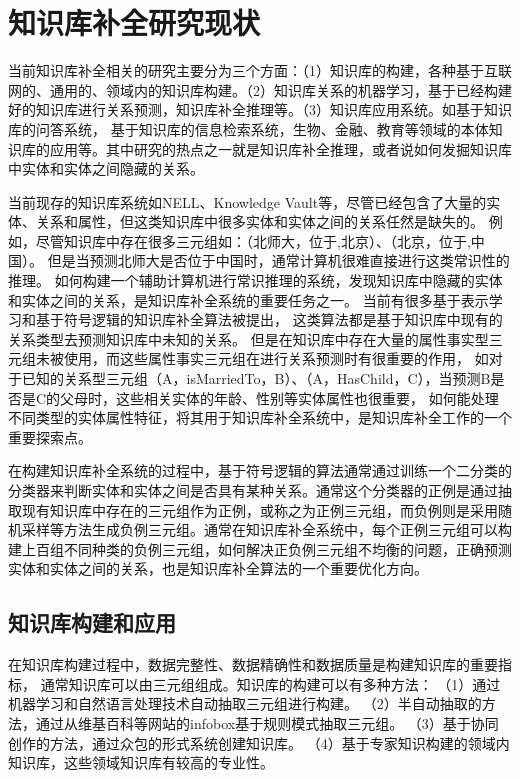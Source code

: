 

\chapter{知识库补全研究现状}
\label{cha:related-work}

当前知识库补全相关的研究主要分为三个方面：（1）知识库的构建，各种基于互联网的、通用的、领域内的知识库构建。（2）知识库关系的机器学习，基于已经构建好的知识库进行关系预测，知识库补全推理等。（3）知识库应用系统。如基于知识库的问答系统，
基于知识库的信息检索系统，生物、金融、教育等领域的本体知识库的应用等。其中研究的热点之一就是知识库补全推理，或者说如何发掘知识库中实体和实体之间隐藏的关系。

当前现存的知识库系统如NELL、Knowledge Vault等，尽管已经包含了大量的实体、关系和属性，但这类知识库中很多实体和实体之间的关系任然是缺失的。
例如，尽管知识库中存在很多三元组如：（北师大，位于,北京）、（北京，位于,中国）。
但是当预测北师大是否位于中国时，通常计算机很难直接进行这类常识性的推理。
如何构建一个辅助计算机进行常识推理的系统，发现知识库中隐藏的实体和实体之间的关系，是知识库补全系统的重要任务之一。
当前有很多基于表示学习和基于符号逻辑的知识库补全算法被提出，
这类算法都是基于知识库中现有的关系类型去预测知识库中未知的关系。
但是在知识库中存在大量的属性事实型三元组未被使用，而这些属性事实三元组在进行关系预测时有很重要的作用，
如对于已知的关系型三元组（A，isMarriedTo，B）、（A，HasChild，C），当预测B是否是C的父母时，这些相关实体的年龄、性别等实体属性也很重要，
如何能处理不同类型的实体属性特征，将其用于知识库补全系统中，是知识库补全工作的一个重要探索点。

在构建知识库补全系统的过程中，基于符号逻辑的算法通常通过训练一个二分类的分类器来判断实体和实体之间是否具有某种关系。通常这个分类器的正例是通过抽取现有知识库中存在的三元组作为正例，或称之为正例三元组，而负例则是采用随机采样等方法生成负例三元组。通常在知识库补全系统中，每个正例三元组可以构建上百组不同种类的负例三元组，如何解决正负例三元组不均衡的问题，正确预测实体和实体之间的关系，也是知识库补全算法的一个重要优化方向。

\section{知识库构建和应用}
在知识库构建过程中，数据完整性、数据精确性和数据质量是构建知识库的重要指标，
通常知识库可以由三元组组成。知识库的构建可以有多种方法：
（1）通过机器学习和自然语言处理技术自动抽取三元组\cite{Weikum2010FromIT}进行构建。
（2）半自动抽取的方法，通过从维基百科等网站的infobox基于规则模式抽取三元组。
（3）基于协同创作\cite{Mitraka2015WikidataAP}的方法，通过众包的形式系统创建知识库。
（4）基于专家知识构建的领域内知识库，这些领域知识库有较高的专业性。


